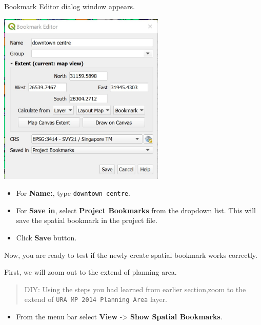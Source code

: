 \documentclass[
  letterpaper,
  DIV=11,
  numbers=noendperiod]{scrreprt}
\providecommand{\tightlist}{%
  \setlength{\itemsep}{0pt}\setlength{\parskip}{0pt}}\usepackage{longtable,booktabs,array}
\begin{document}
Bookmark Editor dialog window appears.

\includegraphics[width=3.125in,height=\textheight]{./img02/image33.jpg}

\begin{itemize}
\item
  For \textbf{Name:}, type \texttt{downtown\ centre}.
\item
  For \textbf{Save in}, select \textbf{Project Bookmarks} from the
  dropdown list. This will save the spatial bookmark in the project
  file.
\item
  Click \textbf{Save} button.
\end{itemize}

Now, you are ready to test if the newly create spatial bookmark works
correctly.

First, we will zoom out to the extend of planning area.

\begin{quote}
DIY: Using the steps you had learned from earlier section,zoom to the
extend of \texttt{URA\ MP\ 2014\ Planning\ Area} layer.
\end{quote}

\begin{itemize}
\tightlist
\item
  From the menu bar select \textbf{View} -\textgreater{} \textbf{Show
  Spatial Bookmarks}.
\end{itemize}
\end{document}
